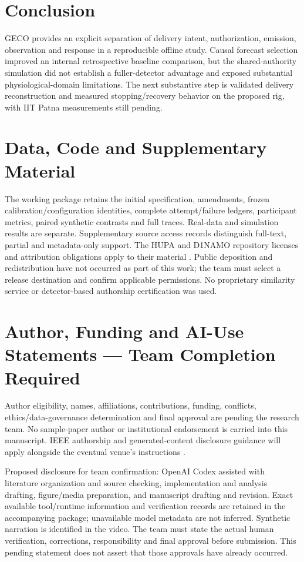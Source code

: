 \documentclass[journal,10pt,letterpaper]{IEEEtran}
\begin{document}
\section{Conclusion}

GECO provides an explicit separation of delivery intent, authorization,
emission, observation and response in a reproducible offline study.
Causal forecast selection improved an internal retrospective baseline
comparison, but the shared-authority simulation did not establish a
fuller-detector advantage and exposed substantial physiological-domain
limitations. The next substantive step is validated delivery
reconstruction and measured stopping/recovery behavior on the proposed
rig, with IIT Patna measurements still pending.

\section*{Data, Code and Supplementary Material}

The working package retains the initial specification, amendments,
frozen calibration/configuration identities, complete attempt/failure
ledgers, participant metrics, paired synthetic contrasts and full
traces. Real-data and simulation results are separate. Supplementary
source access records distinguish full-text, partial and metadata-only
support. The HUPA and D1NAMO repository licenses and attribution
obligations apply to their material \cite{R14,R15}. Public deposition
and redistribution have not occurred as part of this work; the team must
select a release destination and confirm applicable permissions. No
proprietary similarity service or detector-based authorship
certification was used.

\section*{Author, Funding and AI-Use Statements --- Team Completion Required}

Author eligibility, names, affiliations, contributions, funding,
conflicts, ethics/data-governance determination and final approval are
pending the research team. No sample-paper author or institutional
endorsement is carried into this manuscript. IEEE authorship and
generated-content disclosure guidance will apply alongside the eventual
venue's instructions \cite{R10,R11,R12}.

Proposed disclosure for team confirmation: OpenAI Codex assisted with
literature organization and source checking, implementation and analysis
drafting, figure/media preparation, and manuscript drafting and
revision. Exact available tool/runtime information and verification
records are retained in the accompanying package; unavailable model
metadata are not inferred. Synthetic narration is identified in the
video. The team must state the actual human verification, corrections,
responsibility and final approval before submission. This pending
statement does not assert that those approvals have already occurred.

\end{document}
